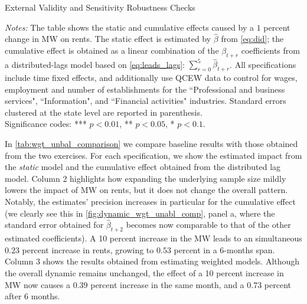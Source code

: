 \begin{table}[h!]\centering
	\caption{External Validity and Sensitivity Robustness Checks}
	\label{tab:wgt_unbal_comparison}
	\resizebox{0.8\textwidth}{!}{
		
	}
	\begin{minipage}{\textwidth}\footnotesize
	\vspace{3mm}	
	\textit{Notes:} The table shows the static and cumulative effects caused by a $1$ percent
	change in MW on rents. The static effect is estimated by $\hat{\beta}$ from \autoref{eq:did};
	the cumulative effect is obtained as a linear combination of the $\beta_{t+r}$ coefficients from 
	a distributed-lags model based on \autoref{eq:leads_lags}: 
	$\sum\limits_{r = 0}^5 \hat{\beta}_{t+r}$. All specifications include time fixed effects, 
	and additionally use QCEW data to control for wages, employment and number of establishments 
	for the ``Professional and business services", ``Information", and ``Financial activities" industries.
	Standard errors clustered at the state level are
	reported in parenthesis. \\
	Significance codes: *** $p < 0.01$, ** $p < 0.05$, * $p < 0.1$. 	
	\end{minipage}
\end{table}

In \autoref{tab:wgt_unbal_comparison} we compare baseline results with those obtained from the 
two exercises. For each specification, we show the estimated impact
from the \textit{static} model and the cumulative effect obtained from the distributed lag model. Column 
2 highlights how expanding the underlying sample size mildly lowers the impact of MW on rents, but 
it does not change the overall pattern. Notably, the estimates' precision increases in particular for 
the cumulative effect (we clearly see this in \autoref{fig:dynamic_wgt_unabl_comp}, panel a, where 
the standard error obtained for $\hat{\beta}_{t+2}$  becomes now comparable to 
that of the other estimated coefficients). A 10 percent increase in the MW leads to an simultaneous 
$0.23$ percent increase in rents, growing to $0.53$ percent in a 6-months span. Column 3 shows 
the results obtained from estimating weighted models. Although the overall dynamic remains unchanged, 
the effect of a 10 percent increase in MW now causes a $0.39$ percent increase in the same month, and 
a $0.73$ percent after 6 months. %


